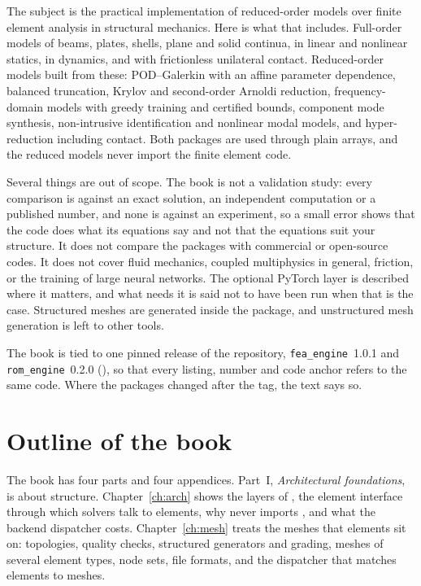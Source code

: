 The subject is the practical implementation of reduced-order models over finite element analysis in structural mechanics. Here is what that includes. Full-order models of beams, plates, shells, plane and solid continua, in linear and nonlinear statics, in dynamics, and with frictionless unilateral contact. Reduced-order models built from these: POD--Galerkin with an affine parameter dependence, balanced truncation, Krylov and second-order Arnoldi reduction, frequency-domain models with greedy training and certified bounds, component mode synthesis, non-intrusive identification and nonlinear modal models, and hyper-reduction including contact. Both packages are used through plain arrays, and the reduced models never import the finite element code.

Several things are out of scope. The book is not a validation study: every comparison is against an exact solution, an independent computation or a published number, and none is against an experiment, so a small error shows that the code does what its equations say and not that the equations suit your structure. It does not compare the packages with commercial or open-source codes. It does not cover fluid mechanics, coupled multiphysics in general, friction, or the training of large neural networks. The optional PyTorch layer is described where it matters, and what needs it is said not to have been run when that is the case. Structured meshes are generated inside the package, and unstructured mesh generation is left to other tools.

The book is tied to one pinned release of the repository, \texttt{fea\_engine}~1.0.1 and \texttt{rom\_engine}~0.2.0 (\booktag), so that every listing, number and code anchor refers to the same code. Where the packages changed after the tag, the text says so.

\section*{Outline of the book}

The book has four parts and four appendices. Part~I, \emph{Architectural foundations}, is about structure. Chapter~\ref{ch:arch} shows the layers of \fea{}, the element interface through which solvers talk to elements, why \rom{} never imports \fea{}, and what the backend dispatcher costs. Chapter~\ref{ch:mesh} treats the meshes that elements sit on: topologies, quality checks, structured generators and grading, meshes of several element types, node sets, file formats, and the dispatcher that matches elements to meshes.

